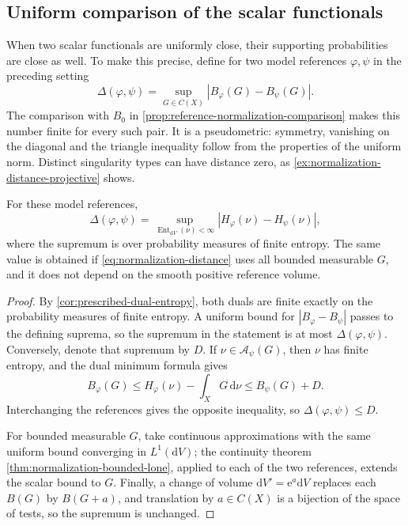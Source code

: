 \subsection{Uniform comparison of the scalar functionals}

When two scalar functionals are uniformly close, their supporting probabilities are close as well. To make this precise, define for two model references $\varphi,\psi$ in the preceding setting
\begin{equation}\label{eq:normalization-distance}
 \Delta(\varphi,\psi)
   =\sup_{G\in C(X)}|B_\varphi(G)-B_\psi(G)|.
\end{equation}
The comparison with $B_0$ in \cref{prop:reference-normalization-comparison} makes this number finite for every such pair. It is a pseudometric: symmetry, vanishing on the diagonal and the triangle inequality follow from the properties of the uniform norm. Distinct singularity types can have distance zero, as \cref{ex:normalization-distance-projective} shows.

\begin{proposition}\label{prop:normalization-distance-dual}
For these model references,
\[
 \Delta(\varphi,\psi)
 =\sup_{\operatorname{Ent}_{\mathrm{d}V}(\nu)<\infty}
                       |H_\varphi(\nu)-H_\psi(\nu)|,
\]
where the supremum is over probability measures of finite entropy. The same value is obtained if \eqref{eq:normalization-distance} uses all bounded measurable $G$, and it does not depend on the smooth positive reference volume.
\end{proposition}
\begin{proof}
By \cref{cor:prescribed-dual-entropy}, both duals are finite exactly on the probability measures of finite entropy. A uniform bound for $|B_\varphi-B_\psi|$ passes to the defining suprema, so the supremum in the statement is at most $\Delta(\varphi,\psi)$. Conversely, denote that supremum by $D$. If $\nu\in\mathcal A_\psi(G)$, then $\nu$ has finite entropy, and the dual minimum formula gives
\[
 B_\varphi(G)
 \leq H_\varphi(\nu)-\int_XG\,\mathrm{d}\nu
 \leq B_\psi(G)+D.
\]
Interchanging the references gives the opposite inequality, so $\Delta(\varphi,\psi)\leq D$.

For bounded measurable $G$, take continuous approximations with the same uniform bound converging in $L^1(\mathrm{d}V)$; the continuity theorem \cref{thm:normalization-bounded-lone}, applied to each of the two references, extends the scalar bound to $G$. Finally, a change of volume $\mathrm{d}V'=\mathrm{e}^a\mathrm{d}V$ replaces each $B(G)$ by $B(G+a)$, and translation by $a\in C(X)$ is a bijection of the space of tests, so the supremum is unchanged.
\end{proof}

